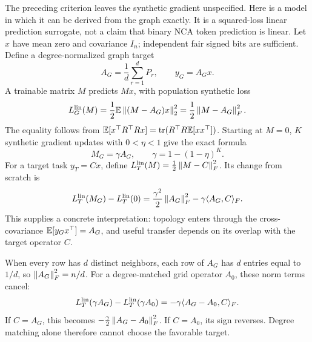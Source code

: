 The preceding criterion leaves the synthetic gradient unspecified.
Here is a model in which it can be derived from the graph exactly.
It is a squared-loss linear prediction surrogate, not a claim that
binary NCA token prediction is linear.
Let $x$ have mean zero and covariance $I_n$; independent fair signed
bits are sufficient. Define a degree-normalized graph target
\[
 A_G=\frac1d\sum_{r=1}^dP_r,\qquad y_G=A_Gx.
\]
A trainable matrix $M$ predicts $Mx$, with population synthetic loss
\begin{equation}
 L_G^{\rm lin}(M)=\frac12\mathbb{E}\left\lVert (M-A_G)x\right\rVert_2^2
                 =\frac12\left\lVert M-A_G\right\rVert_F^2.
 \label{eq:linearsynthetic}
\end{equation}
The equality follows from
$\mathbb{E}[x^\top R^\top R x]={\rm tr}(R^\top R\mathbb{E}[xx^\top])$.
Starting at $M=0$, $K$ synthetic gradient updates with
$0<\eta<1$ give the exact formula
\begin{equation}
 M_G=\gamma A_G,\qquad
 \gamma=1-(1-\eta)^K.
 \label{eq:linearpretrain}
\end{equation}
For a target task $y_T=Cx$, define
$L_T^{\rm lin}(M)=\tfrac12\left\lVert M-C\right\rVert_F^2$. Its change from scratch is
\begin{equation}
 L_T^{\rm lin}(M_G)-L_T^{\rm lin}(0)
 =\frac{\gamma^2}{2}\left\lVert A_G\right\rVert_F^2
       -\gamma\langle A_G,C\rangle_F.
 \label{eq:graphcovtransfer}
\end{equation}
This supplies a concrete interpretation: topology enters through the
cross-covariance $\mathbb{E}[y_Gx^\top]=A_G$, and useful transfer depends on
its overlap with the target operator $C$.

When every row has $d$ distinct neighbors, each row of $A_G$ has $d$
entries equal to $1/d$, so $\left\lVert A_G\right\rVert_F^2=n/d$.
For a degree-matched grid operator $A_0$, these norm terms cancel:
\begin{equation}
 L_T^{\rm lin}(\gamma A_G)-L_T^{\rm lin}(\gamma A_0)
 =-\gamma\langle A_G-A_0,C\rangle_F.
 \label{eq:exactgraphtarget}
\end{equation}
If $C=A_G$, this becomes
$-\tfrac{\gamma}{2}\left\lVert A_G-A_0\right\rVert_F^2$.
If $C=A_0$, its sign reverses. Degree matching alone therefore cannot
choose the favorable target.

